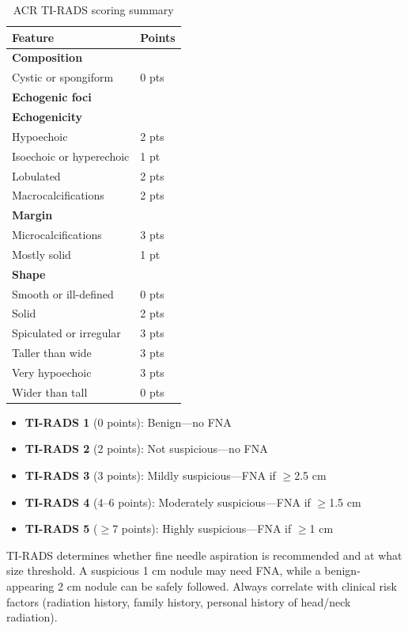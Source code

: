\begin{table}[h]
\centering
\caption{ACR TI-RADS scoring summary}
\begin{tabular}{|l|l|}
\hline
\textbf{Feature} & \textbf{Points} \\
\hline
\textbf{Composition} & \\
Cystic or spongiform & 0 pts \\
\textbf{Echogenic foci} & \\
\textbf{Echogenicity} & \\
\hline
Hypoechoic & 2 pts \\
Isoechoic or hyperechoic & 1 pt \\
Lobulated & 2 pts \\
Macrocalcifications & 2 pts \\
\hline
\textbf{Margin} & \\
Microcalcifications & 3 pts \\
Mostly solid & 1 pt \\
\hline
\textbf{Shape} & \\
Smooth or ill-defined & 0 pts \\
Solid & 2 pts \\
Spiculated or irregular & 3 pts \\
\hline
Taller than wide & 3 pts \\
Very hypoechoic & 3 pts \\
Wider than tall & 0 pts \\
\hline
\end{tabular}
\end{table}

\begin{itemize}
  \item \textbf{TI-RADS 1} (0 points): Benign---no FNA
  \item \textbf{TI-RADS 2} (2 points): Not suspicious---no FNA
  \item \textbf{TI-RADS 3} (3 points): Mildly suspicious---FNA if $\geq$2.5 cm
  \item \textbf{TI-RADS 4} (4--6 points): Moderately suspicious---FNA if $\geq$1.5 cm
  \item \textbf{TI-RADS 5} ($\geq$7 points): Highly suspicious---FNA if $\geq$1 cm
\end{itemize}

\begin{pearlbox}
TI-RADS determines whether fine needle aspiration is recommended and at what size threshold. A suspicious 1 cm nodule may need FNA, while a benign-appearing 2 cm nodule can be safely followed. Always correlate with clinical risk factors (radiation history, family history, personal history of head/neck radiation).
\end{pearlbox}

